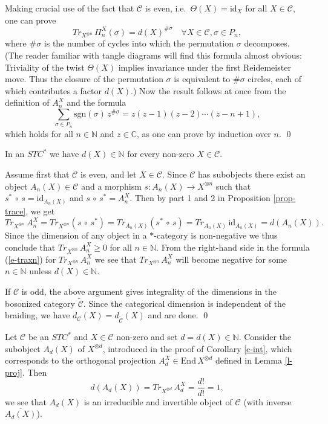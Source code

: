 \documentclass[11pt]{article}
\theoremstyle{definition}
\theoremstyle{definition}
\theoremstyle{remark}
\def\2#1{{\mathcal #1}}
\def\7#1{{\mathbb #1}}
\newcommand{\End}{\mathrm{End}}
\newcommand{\mcirc}{\,\circ\,}
\newcommand{\rarr}{\rightarrow}
\def\id{\mathrm{id}}
\begin{document}
 Making crucial use of the fact that $\2C$ is even,
i.e.\ $\Theta(X)=\id_X$ for all $X\in\2C$, one can prove
\[   Tr_{X^{\otimes n}}\,\Pi_n^X(\sigma)= d(X)^{\#\sigma} \quad\forall X\in\2C, \sigma\in P_n, \]
where $\#\sigma$ is the number of cycles into which the permutation $\sigma$ decomposes. (The reader
familiar with tangle diagrams will find this formula almost obvious: Triviality of the twist
$\Theta(X)$ implies invariance under the first Reidemeister move. Thus the closure of the
permutation $\sigma$ is equivalent to $\#\sigma$ circles, each of which contributes a factor $d(X)$.)
Now the result follows at once from the definition of $A_n^X$ and the formula
\[  \sum_{\sigma\in P_n} \mathrm{sgn}(\sigma)\,z^{\#\sigma}=z(z-1)(z-2)\cdots (z-n+1), \]
which holds for all $n\in\7N$ and $z\in\7C$, as one can prove by induction over $n$.
\qed

\bcoro \label{c-int} 
In an $STC^*$ we have $d(X)\in\7N$ for every non-zero $X\in\2C$.
\ecoro 

\prf Assume first that $\2C$ is even, and let $X\in\2C$. Since $\2C$ has subobjects there exist an
object $A_n(X)\in\2C$ and a morphism $s: A_n(X)\rarr X^{\otimes n}$ such that 
$s^*\mcirc  s=\id_{A_n(X)}$ and $s\mcirc  s^*=A^X_n$. Then by part 1 and 2 in Proposition
\ref{prop-trace}, we get 
\[ Tr_{X^{\otimes n}}\,A_n^X = Tr_{X^{\otimes n}}(s\mcirc s^*) =
Tr_{A_n(X)}(s^*\mcirc s) =Tr_{A_n(X)}\,\id_{A_n(X)} = d({A_n(X)}). \]
Since the dimension of any object in a $*$-category is non-negative we
thus conclude that $Tr_{X^{\otimes n}}\,A_n^X\ge 0$ for all $n\in\7N$.
From the right-hand side in the formula (\ref{e-traxn}) for
$Tr_{X^{\otimes n}}\,A_n^X$ we see that $Tr_{X^{\otimes n}}\,A_n^X$
will become negative for some $n\in\7N$ unless $d(X)\in\7N$.

If $\2C$ is odd, the above argument gives integrality of the dimensions in the bosonized category
$\widetilde{\2C}$. Since the categorical dimension is independent of the braiding, we have
$d_\2C(X)=d_{\widetilde{\2C}}(X)$ and are done.
\qed


Let $\2C$ be an $STC^*$ and $X\in\2C$ non-zero and set $d=d(X)\in\7N$. Consider the subobject 
$A_d(X)$ of $X^{\otimes d}$, introduced in the proof of Corollary \ref{c-int}, which corresponds to
the orthogonal projection $A_d^X\in\End\,X^{\otimes d}$ defined in Lemma \ref{l-proj}. Then
\[ d(A_d (X))=Tr_{X^{\otimes d}}\,A_d^X=\frac{d!}{d!}=1 ,\]
we see that $A_d (X)$ is an irreducible and invertible object of $\2C$ (with inverse $\overline{A_d (X)}$).
\end{document}
